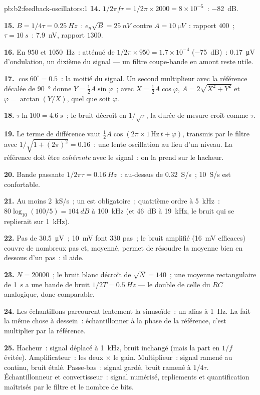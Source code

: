 \begin{solution}{pb:b2:feedback-oscillators:1}
\textbf{14.} $1/2\pi f\tau = 1/2\pi \times 2000 = 8 \times 10^{-5}$~: \qty{-82}{dB}.

\textbf{15.} $B = 1/4\tau = \qty{0.25}{Hz}$~: $e_n\sqrt B = \qty{25}{nV}$ contre $A =
\qty{10}{\micro V}$~: rapport $400$~; $\tau = \qty{10}{s}$~: \qty{7.9}{nV}, rapport $1300$.

\textbf{16.} En $950$ et \qty{1050}{Hz}~: atténué de $1/2\pi \times 950 = 1.7 \times
10^{-4}$ (\qty{-75}{dB})~: \qty{0.17}{\micro V} d'ondulation, un dixième du signal ---
un filtre coupe-bande en amont reste utile.

\textbf{17.} $\cos60^\circ = 0.5$~: la moitié du signal. Un second multiplieur avec
la référence décalée de \qty{90}{\degree} donne $Y = \tfrac12A\sin\varphi$~; avec $X =
\tfrac12A\cos\varphi$, $A = 2\sqrt{X^2 + Y^2}$ et $\varphi = \arctan(Y/X)$, quel que soit $\varphi$.

\textbf{18.} $\tau\ln100 = \qty{4.6}{s}$~; le bruit décroît en $1/\sqrt\tau$, la
durée de mesure croît comme $\tau$.

\textbf{19.} Le terme de différence vaut $\tfrac12A\cos(2\pi \times 1\,\text{Hz}\,t + \varphi)$,
transmis par le filtre avec $1/\sqrt{1 + (2\pi)^2} = 0.16$~: une lente
oscillation au lieu d'un niveau. La référence doit être \emph{cohérente}
avec le signal~: on la prend sur le hacheur.

\textbf{20.} Bande passante $1/2\pi\tau = \qty{0.16}{Hz}$~: au-dessus de \qty{0.32}{S/s}~;
\qty{10}{S/s} est confortable.

\textbf{21.} Au moins \qty{2}{kS/s}~; un  est obligatoire~;
quatrième ordre à \qty{5}{kHz}~: $80\log_{10}(100/5) = \qty{104}{dB}$ à \qty{100}{kHz}
(et \qty{46}{dB} à \qty{19}{kHz}, le bruit qui se replierait sur \qty{1}{kHz}).

\textbf{22.} Pas de \qty{30.5}{\micro V}~; \qty{10}{mV} font $330$ pas~; le bruit
amplifié (\qty{16}{mV} efficaces) couvre de nombreux pas et, moyenné, permet de résoudre la
moyenne bien en dessous d'un pas~: il aide.

\textbf{23.} $N = 20000$~; le bruit blanc décroît de $\sqrt N = 140$~; une
moyenne rectangulaire de \qty{1}{s} a une bande de bruit $1/2T = \qty{0.5}{Hz}$ --- le double de celle
du $RC$ analogique, donc comparable.

\textbf{24.} Les échantillons parcourent lentement la sinusoïde~: un alias à \qty{1}{Hz}.
La  fait la même chose à dessein~: échantillonner à la phase de la
référence, c'est multiplier par la référence.

\textbf{25.} Hacheur~: signal déplacé à \qty{1}{kHz}, bruit inchangé (mais
la part en $1/f$ évitée). Amplificateur~: les deux $\times$ le gain. Multiplieur~: signal
ramené au continu, bruit étalé. Passe-bas~: signal gardé, bruit ramené à $1/4\tau$.
Échantillonneur et convertisseur~: signal numérisé, repliements et quantification maîtrisés par
le filtre et le nombre de bits.
\end{solution}
